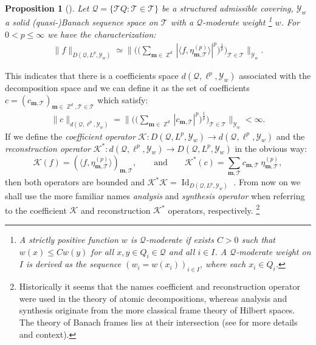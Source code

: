\documentclass[11pt,a4paper]{article}
\numberwithin{equation}{section}
\newtheorem{proposition}[theorem]{Proposition}
\def\<{\langle}
\def\>{\rangle}
\DeclareMathOperator{\Z}{\mathbb{Z}}
\DeclareMathOperator{\Id}{Id}
\newcommand{\mcQ}{\mathcal{Q}}  %
\newcommand{\mcT}{\mathcal{T}}  %
\newcommand{\mcY}{\mathcal{Y}}
\newcommand{\msT}{\mathscr{T}} %
\newcommand{\msK}{\mathscr{K}}
\renewcommand{\vec}[1]{\boldsymbol{#1}} %
\begin{document}
\begin{proposition}[{\cite[Proposition 3]{borup2007frame}}]
Let $\mcQ = \lbrace \msT Q : \msT \in \mcT \rbrace$ be a structured admissible covering, $\mcY_w$ a solid (quasi-)Banach sequence space on $\mcT$ with a $\mcQ$-moderate weight%
\footnote{A strictly positive function $w$ is $\mcQ$-moderate if exists $C > 0$ such that $w(x) \leqslant C w(y)$ for all $x,y \in Q_i \in \mcQ$ and all $i \in I$. A $\mcQ$-moderate \textit{weight} on $I$ is derived as the sequence $\left( w_i = w(x_i) \right)_{i \in I}$, where each $x_i \in Q_i$.}  $w$. %
For $0 < p \leqslant \infty$ we have the characterization:
\begin{align*}
    \| f \|_{D(\mcQ, L^p, \mcY_w)} \simeq \Bigg\| \bigg( \Big( \sum_{\vec{m} \in \Z^d} |\< f, \eta_{\vec{m},\msT}^{(p)} \> |^p \Big)^{\frac{1}{p}} \bigg)_{\msT \in \mcT} \Bigg\|_{\mcY_w}.
\end{align*}
\end{proposition}
This indicates that there is a coefficients space $d(\mcQ, \ell^p, \mcY_w)$ associated with the decomposition space and we can define it as the set of coefficients $c = (c_{\vec{m},\msT})_{\vec{m} \in \Z^d,\msT \in \mcT}$ which satisfy:
\begin{align*}
    \| c \|_{d(\mcQ, \ell^p, \mcY_w)} = \Bigg\| \bigg( \Big( \sum_{\vec{m} \in \Z^d} | c_{\vec{m},\msT} |^p \Big)^{\frac{1}{p}} \bigg)_{\msT \in \mcT} \Bigg\|_{\mcY_w} < \infty.
\end{align*}
If we define the \emph{coefficient operator} $\msK: D(\mcQ, L^p, \mcY_w) \rightarrow d(\mcQ, \ell^p, \mcY_w)$ and the \emph{reconstruction operator} $\msK^*: d(\mcQ, \ell^p, \mcY_w) \rightarrow D(\mcQ, L^p, \mcY_w)$ in the obvious way:
\begin{equation*}
    \msK (f) = \left( \< f, \eta_{\vec{m},\msT}^{(p)} \> \right)_{\vec{m},\msT}, 
    \qquad \text{and} \qquad 
    \msK^* (c) = \sum_{\vec{m},\msT} c_{\vec{m},\msT} \, \eta_{\vec{m},\msT}^{(p)},
\end{equation*}
then both operators are bounded and $\msK^* \msK = \Id_{D(\mcQ, L^p, \mcY_w)}$ \cite{borup2007frame}. From now on we shall use the more familiar names \emph{analysis} and \emph{synthesis operator} when referring to the coefficient $\msK$ and reconstruction $\msK^*$ operators, respectively.\!
\footnote{Historically it seems that the names coefficient and reconstruction operator were used in the theory of atomic decompositions, whereas analysis and synthesis originate from the more classical frame theory of Hilbert spaces. The theory of Banach frames lies at their intersection (see \cite{casazza1999frames, carando2011reconstruction} for more details and context).}
\end{document}
